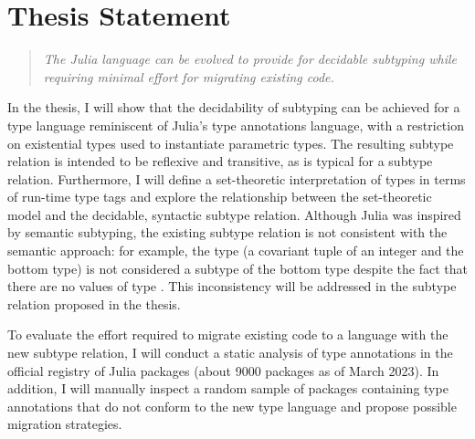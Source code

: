 \chapter{Thesis Statement}\label{chap:3}


\begin{quotation}\emph{
  The Julia language can be evolved to provide for decidable subtyping while
  requiring minimal effort for migrating existing code.
}\end{quotation}

In the thesis, I will show that
the decidability of subtyping can be achieved
for a type language reminiscent of Julia's type annotations language,
with a restriction on existential types used to instantiate parametric types.
The resulting subtype relation is intended to be reflexive and transitive,
as is typical for a subtype relation. 
Furthermore, I will define a set-theoretic interpretation of types
in terms of run-time type tags and explore the relationship between
the set-theoretic model
and the decidable, syntactic subtype relation.
Although Julia was inspired by semantic subtyping, the existing subtype relation
is not consistent with the semantic approach: for example, the type 
 (a covariant tuple of an integer and the bottom type)
is not considered a subtype of the bottom type despite the fact that there are
no values of type .
This inconsistency will be addressed in the subtype relation proposed
in the thesis.

To evaluate the effort required to migrate existing code to a language
with the new subtype relation, I will conduct a static analysis of type
annotations in the official registry of Julia packages
(about 9000 packages as of March 2023).
In addition, I will manually inspect a random sample of packages containing
type annotations that do not conform to the new type language
and propose possible migration strategies.

